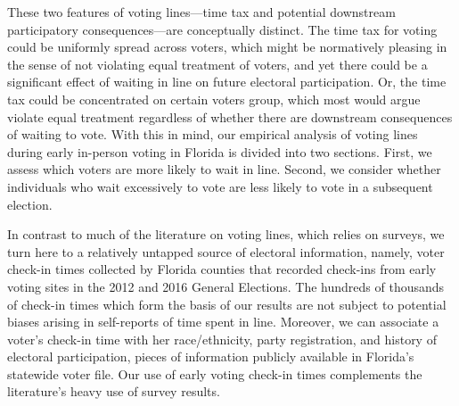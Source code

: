 \documentclass[12pt,titlepage]{article}
\begin{document}


These two features of voting lines---time tax and potential downstream
participatory consequences---are conceptually distinct. The time tax
for voting could be uniformly spread across voters, which might be
normatively pleasing in the sense of not violating equal treatment of
voters, and yet there could be a significant effect of waiting in line
on future electoral participation. Or, the time tax could be
concentrated on certain voters group, which most would argue violate
equal treatment regardless of whether there are downstream
consequences of waiting to vote. With this in mind, our empirical
analysis of voting lines during early in-person voting in Florida is
divided into two sections. First, we assess which voters are more
likely to wait in line. Second, we consider whether individuals who
wait excessively to vote are less likely to vote in a subsequent
election.



In contrast to much of the literature on voting lines, which relies on
surveys, we turn here to a relatively untapped source of electoral
information, namely, voter check-in times collected by Florida
counties that recorded check-ins from early voting sites in the 2012
and 2016 General Elections.  The hundreds of thousands of check-in
times which form the basis of our results are not subject to potential
biases arising in self-reports of time spent in line.  Moreover, we
can associate a voter's check-in time with her race/ethnicity, party
registration, and history of electoral participation, pieces of
information publicly available in Florida's statewide voter file.  Our
use of early voting check-in times complements the literature's heavy
use of survey results.
\end{document}

